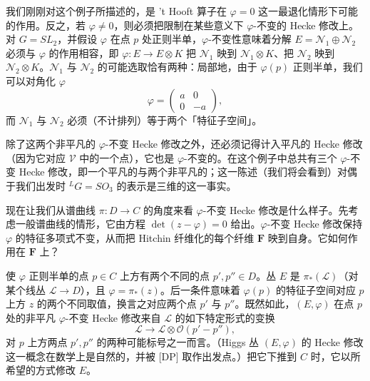 我们刚刚对这个例子所描述的，是 't Hooft 算子在 $\varphi=0$ 这一最退化情形下可能的作用。反之，若 $\varphi\neq0$，则必须把限制在某些意义下 $\varphi$-不变的 Hecke 修改上。对 $G=SL_2$，并假设 $\varphi$ 在点 $p$ 处正则半单，$\varphi$-不变性意味着分解 $E=\mathcal{N}_1\oplus\mathcal{N}_2$ 必须与 $\varphi$ 的作用相容，即 $\varphi:E\to E\otimes K$ 把 $\mathcal{N}_1$ 映到 $\mathcal{N}_1\otimes K$、把 $\mathcal{N}_2$ 映到 $\mathcal{N}_2\otimes K$。$\mathcal{N}_1$ 与 $\mathcal{N}_2$ 的可能选取恰有两种：局部地，由于 $\varphi(p)$ 正则半单，我们可以对角化 $\varphi$
\begin{equation}\tag{5.26}
\varphi=\begin{pmatrix}
a & 0\\
0 & -a
\end{pmatrix},
\end{equation}
而 $\mathcal{N}_1$ 与 $\mathcal{N}_2$ 必须（不计排列）等于两个「特征子空间」。



除了这两个非平凡的 $\varphi$-不变 Hecke 修改之外，还必须记得计入平凡的 Hecke 修改（因为它对应 $\mathcal{V}$ 中的一个点），它也是 $\varphi$-不变的。在这个例子中总共有三个 $\varphi$-不变 Hecke 修改，即一个平凡的与两个非平凡的；这一陈述（我们将会看到）对偶于我们出发时 ${}^{L}G=SO_3$ 的表示是三维的这一事实。

现在让我们从谱曲线 $\pi:D\to C$ 的角度来看 $\varphi$-不变 Hecke 修改是什么样子。先考虑一般谱曲线的情形，它由方程 $\det(z-\varphi)=0$ 给出。$\varphi$-不变 Hecke 修改保持 $\varphi$ 的特征多项式不变，从而把 Hitchin 纤维化的每个纤维 $\boldsymbol{F}$ 映到自身。它如何作用在 $\boldsymbol{F}$ 上？

使 $\varphi$ 正则半单的点 $p\in C$ 上方有两个不同的点 $p',p''\in D$。丛 $E$ 是 $\pi_*(\mathcal{L})$（对某个线丛 $\mathcal{L}\to D$），且 $\varphi=\pi_*(z)$。后一条件意味着 $\varphi(p)$ 的特征子空间对应 $p$ 上方 $z$ 的两个不同取值，换言之对应两个点 $p'$ 与 $p''$。既然如此，$(E,\varphi)$ 在点 $p$ 处的非平凡 $\varphi$-不变 Hecke 修改来自 $\mathcal{L}$ 的如下特定形式的变换
\begin{equation}\tag{5.27}
\mathcal{L}\to\mathcal{L}\otimes\mathcal{O}(p'-p''),
\end{equation}
对 $p$ 上方两点 $p',p''$ 的两种可能标号之一而言。（Higgs 丛 $(E,\varphi)$ 的 Hecke 修改这一概念在数学上是自然的，并被 [DP] 取作出发点。）把它下推到 $C$ 时，它以所希望的方式修改 $E$。

